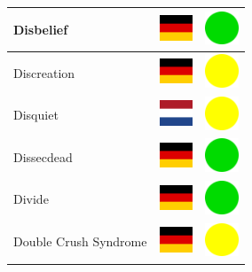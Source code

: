 \documentclass[12pt, a4paper, twoside]{report}
\begin{document}
\begin{center}
\begin{longtable}{|p{5cm}|p{2cm}|p{2cm}|}
			Disbelief & \includegraphics[width=1cm]{4x3/de} & \includegraphics[width=1cm]{likes/y} \\ \hline
			Discreation & \includegraphics[width=1cm]{4x3/de} & \includegraphics[width=1cm]{likes/m} \\ \hline
			Disquiet & \includegraphics[width=1cm]{4x3/nl} & \includegraphics[width=1cm]{likes/m} \\ \hline
			Dissecdead & \includegraphics[width=1cm]{4x3/de} & \includegraphics[width=1cm]{likes/y} \\ \hline
			Divide & \includegraphics[width=1cm]{4x3/de} & \includegraphics[width=1cm]{likes/y} \\ \hline
			Double Crush Syndrome & \includegraphics[width=1cm]{4x3/de} & \includegraphics[width=1cm]{likes/m} \\ \hline

\end{longtable}
\end{center}
\end{document}
